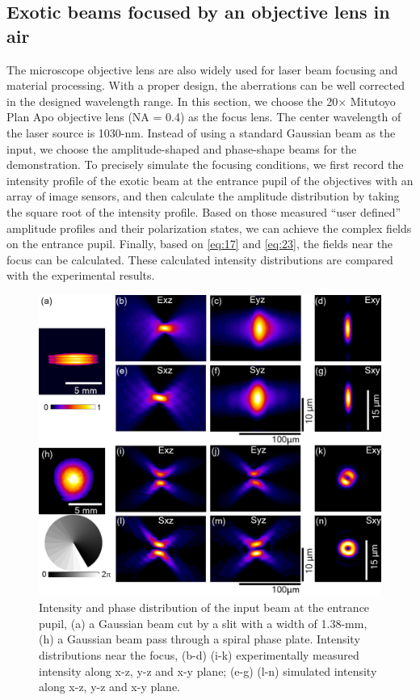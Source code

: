 \documentclass[9pt,twocolumn,twoside]{osajnl}
\begin{document}
\subsection{Exotic beams focused by an objective lens in air}
The microscope objective lens are also widely used for laser beam focusing and material processing. With a proper design, the aberrations can be well corrected in the designed wavelength range. In this section, we choose the 20$\times$ Mitutoyo Plan Apo objective lens (NA = 0.4) as the focus lens. The center wavelength of the laser source is 1030-nm. Instead of using a standard Gaussian beam as the input, we choose the amplitude-shaped and phase-shape beams for the demonstration. To precisely simulate the focusing conditions, we first record the intensity profile of the exotic beam at the entrance pupil of the objectives with an array of image sensors, and then calculate the amplitude distribution by taking the square root of the intensity profile. Based on those measured ``user defined'' amplitude profiles and their polarization states, we can achieve the complex fields on the entrance pupil. Finally, based on \eqref{eq:17} and \eqref{eq:23}, the fields near the focus can be calculated. These calculated intensity distributions are compared with the experimental results. 

\begin{figure}
	\centering
	\includegraphics[width=\linewidth]{../AppOptics/figures/20xairExotic.pdf}
	\caption{Intensity and phase distribution of the input beam at the entrance pupil, (a) a Gaussian beam cut by a slit with a width of 1.38-mm, (h) a Gaussian beam pass through a spiral phase plate. Intensity distributions near the focus, (b-d) (i-k) experimentally measured intensity along x-z, y-z and x-y plane; (e-g) (l-n) simulated intensity along x-z, y-z and x-y plane.}\label{fig:4}
\end{figure}
\end{document}
